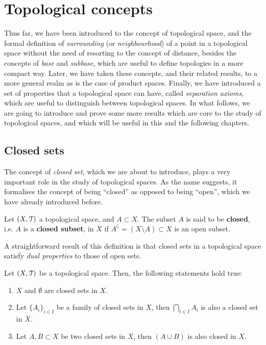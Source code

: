 \section{Topological concepts}\label{sec:topological-concepts}

Thus far, we have been introduced to the concept of topological space, and the formal definition of \emph{surrounding} (or \emph{neighbourhood}) of a point in a topological space without the need of resorting to the concept of distance, besides the concepts of \emph{base} and \emph{subbase}, which are useful to define topologies in a more compact way.
Later, we have taken these concepts, and their related results, to a more general realm as is the case of product spaces.
Finally, we have introduced a set of properties that a topological space can have, called \emph{separation axioms}, which are useful to distinguish between topological spaces.
In what follows, we are going to introduce and prove some more results which are core to the study of topological spaces, and which will be useful in this and the following chapters.

\subsection{Closed sets}\label{subsec:closed-sets}

The concept of \emph{closed set}, which we are about to introduce, plays a very important role in the study
of topological spaces.
As the name suggests, it formalises the concept of being ``closed'' as opposed to being ``open'', which we have already introduced before.

\begin{definition}
	\label{def:closed-set}
	Let $(X,\EuScript{T})$ a topological space, and $A\subset X$.
	The subset $A$ is said to be \textbf{closed}, i.e. $A$ is a \textbf{closed subset}, in $X$ if $A^\complement=(X\setminus A)\subset X$ is an open subset.
\end{definition}

A straightforward result of this definition is that closed sets in a topological space satisfy \emph{dual properties} to those of open sets.

\begin{lemma}
	\label{lem:toplogy-closed-sets}
	Let $(X, \EuScript{T})$ be a topological space. Then, the following statements hold true:
	\begin{enumerate}
		\item $X$ and $\emptyset$ are closed sets in $X$.
		\item Let $\{A_i\}_{i\in I}$ be a family of closed sets in $X$, then $\bigcap_{i\in I} A_i$ is also a closed set in $X$.
		\item Let $A, B\subset X$ be two closed sets in $X$, then $(A\cup B)$ is also closed in $X$.
	\end{enumerate}
\end{lemma}

